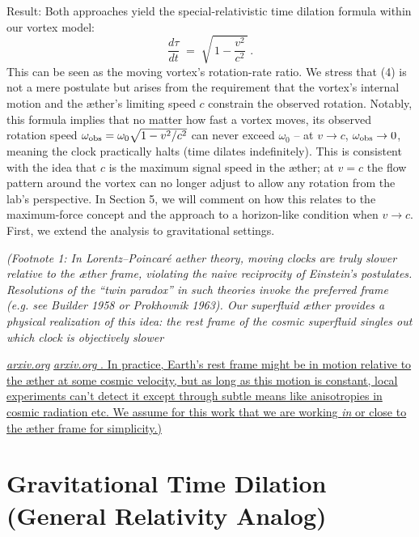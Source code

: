 \documentclass[aps,preprint,superscriptaddress]{revtex4}
\begin{document}
Result: Both approaches yield the special-relativistic time dilation formula within our vortex model:
\begin{equation}
\boxed{\frac{d\tau}{dt} \;=\; \sqrt{\,1-\frac{v^2}{c^2}\,}\,.} \tag{4}
\end{equation}
This can be seen as the moving vortex’s rotation-rate ratio. We stress that (4) is not a mere postulate but arises from the requirement that the vortex’s internal motion and the æther’s limiting speed $c$ constrain the observed rotation. Notably, this formula implies that no matter how fast a vortex moves, its observed rotation speed $\omega_{\rm obs}=\omega_0\sqrt{1-v^2/c^2}$ can never exceed $\omega_0$ – at $v\to c$, $\omega_{\rm obs}\to 0$, meaning the clock practically halts (time dilates indefinitely). This is consistent with the idea that $c$ is the maximum signal speed in the æther; at $v=c$ the flow pattern around the vortex can no longer adjust to allow any rotation from the lab’s perspective. In Section 5, we will comment on how this relates to the maximum-force concept and the approach to a horizon-like condition when $v\to c$. First, we extend the analysis to gravitational settings.


\textit{(Footnote 1: In Lorentz–Poincaré aether theory, moving clocks are truly slower relative to the æther frame, violating the naive reciprocity of Einstein’s postulates. Resolutions of the “twin paradox” in such theories invoke the preferred frame (e.g. see Builder 1958 or Prokhovnik 1963). Our superfluid æther provides a physical realization of this idea: the rest frame of the cosmic superfluid singles out which clock is objectively slower }

\href{https://arxiv.org/pdf/physics/0611077#:~:text=We%20should%20note%20that%2C%20when,a%20state%20of%20absolute%20rest}{\textit{arxiv.org}}
\href{https://arxiv.org/pdf/physics/0611077#:~:text=The%20resolution%20of%20the%20paradoxes,ordinate}{\textit{arxiv.org}
. In practice, Earth’s rest frame might be in motion relative to the æther at some cosmic velocity, but as long as this motion is constant, local experiments can’t detect it except through subtle means like anisotropies in cosmic radiation etc. We assume for this work that we are working \textit{in} or close to the æther frame for simplicity.)}


\section*{Gravitational Time Dilation (General Relativity Analog)}
\end{document}
